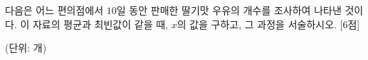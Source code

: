 다음은 어느 편의점에서 $10$일 동안 판매한 딸기맛 우유의 개수를 조사하여 나타낸 것이다. 이 자료의 평균과 최빈값이 같을 때, $x$의 값을 구하고, 그 과정을 서술하시오. \mbox{[6점]}\par\noindent\hfill{\footnotesize (단위: 개)}
